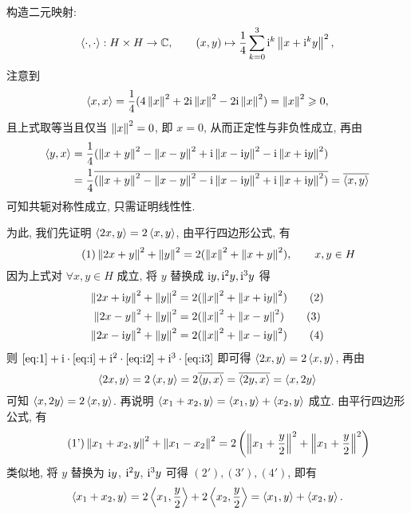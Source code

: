 \begin{Proof}
	构造二元映射:
	\[
		\left\langle \cdot, \cdot \right\rangle: H\times H\to \mathbb{C}, \qquad(x, y)\mapsto\frac{1}{4}\sum_{k=0}^3\mathrm{i}^k\left\| x+\mathrm{i}^ky \right\|^2,
	\]
	注意到
	\[
		\left\langle x, x \right\rangle=\frac{1}{4}(4\left\| x \right\|^{2}+2\mathrm{i}\left\| x \right\|^{2}-2\mathrm{i}\left\| x \right\|^{2})=\left\| x \right\|^{2}\geqslant0,
	\]
	且上式取等当且仅当 $ \left\| x \right\|^{2}=0 $, 即 $ x=0 $, 从而正定性与非负性成立, 再由
	\[
		\begin{aligned}
			\left\langle y, x \right\rangle & =\frac{1}{4}(\left\| x+y \right\|^{2}-\left\| x-y \right\|^{2}+\mathrm{i}\left\| x-\mathrm{i} y \right\|^{2}-\mathrm{i}\left\| x+\mathrm{i} y \right\|^{2})                                \\
			               & = \frac{1}{4}\overline{(\left\| x+y \right\|^{2}-\left\| x-y \right\|^{2}-\mathrm{i}\left\| x-\mathrm{i} y \right\|^{2}+\mathrm{i}\left\| x+\mathrm{i} y \right\|^{2})} =\overline{\left\langle x, y \right\rangle}
		\end{aligned}
	\]
	可知共轭对称性成立, 只需证明线性性.

	为此, 我们先证明 $ \left\langle 2x, y \right\rangle=2\left\langle x, y \right\rangle $, 由平行四边形公式, 有
	\begin{equation}\tag{1}
		\left\| 2x+y \right\|^{2}+\left\| y \right\|^{2}=2(\left\| x \right\|^{2}+\left\| x+y \right\|^{2}),\qquad x, y\in H\label{eq:1}
	\end{equation}
	因为上式对 $ \forall x, y\in H $ 成立, 将 $ y $ 替换成 $ \mathrm{i} y, \mathrm{i}^{2} y, \mathrm{i}^{3} y $ 得
	\begin{align}
		\left\| 2x+\mathrm{i} y \right\|^{2}+\left\| y \right\|^{2} & =2(\left\| x \right\|^{2}+\left\| x+\mathrm{i} y \right\|^{2})\tag{2}\label{eq:i}  \\
		\left\| 2x-y \right\|^{2}+\left\| y \right\|^{2}       & =2(\left\| x \right\|^{2}+\left\| x-y \right\|^{2})\tag{3}\label{eq:i2}       \\
		\left\| 2x-\mathrm{i} y \right\|^{2}+\left\| y \right\|^{2} & =2(\left\| x \right\|^{2}+\left\| x-\mathrm{i} y \right\|^{2})\label{eq:i3}\tag{4}
	\end{align}
	则 $ \eqref{eq:1}+\mathrm{i}\cdot\eqref{eq:i}+\mathrm{i}^{2}\cdot\eqref{eq:i2}+\mathrm{i}^{3}\cdot\eqref{eq:i3} $ 即可得 $ \left\langle 2x, y \right\rangle=2\left\langle x, y \right\rangle $, 再由
	\[
		\left\langle 2x, y \right\rangle=2\left\langle x, y \right\rangle=2\overline{\left\langle y, x \right\rangle}=\overline{\left\langle 2y, x \right\rangle}=\left\langle x, 2y \right\rangle
	\]
	可知 $ \left\langle x, 2y \right\rangle=2\left\langle x, y \right\rangle $. 再说明 $ \left\langle x_{1}+x_{2}, y \right\rangle=\left\langle x_{1}, y \right\rangle+\left\langle x_{2}, y \right\rangle $ 成立. 由平行四边形公式, 有
	\begin{equation}\tag{1'}
		\left\| x_{1}+x_{2}, y \right\|^{2}+\left\| x_{1}-x_{2} \right\|^{2}=2\left( \left\| x_{1}+\frac{y}{2} \right\|^{2}+\left\| x_{1}+\frac{y}{2} \right\|^{2} \right)
	\end{equation}
	类似地, 将 $ y $ 替换为 $ \mathrm{i} y $, $ \mathrm{i}^{2}y $, $ \mathrm{i}^{3}y $ 可得 $ (2'), (3'), (4') $, 即有
	\[
		\left\langle x_{1}+x_{2}, y \right\rangle=2\left\langle x_{1}, \frac{y}{2} \right\rangle+2\left\langle x_{2}, \frac{y}{2} \right\rangle=\left\langle x_{1}, y \right\rangle+\left\langle x_{2}, y \right\rangle.
	\]


\end{Proof}
